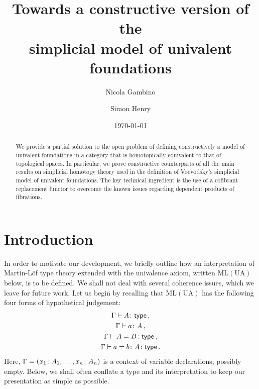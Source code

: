 \documentclass[reqno,10pt,a4paper,oneside,draft]{amsart}
\title[]{Towards a constructive version of the \\ simplicial model of univalent foundations}
\begin{document}
\begin{abstract}
We provide a partial solution to the open problem of defining constructively a model of univalent foundations in a category that is homotopically equivalent to that of topological spaces.
In particular, we prove constructive counterparts of all the main results on simplicial homotopy theory
used in the definition of Voevodsky's simplicial model of univalent foundations. The key technical ingredient
is the use of a cofibrant replacement functor to overcome the known issues regarding dependent products of fibrations.
\end{abstract}

\author{Nicola Gambino}

\author{Simon Henry}


 \date{\today}
 
 

\maketitle


\section{Introduction} 









In order to motivate our development, we briefly outline how an interpretation of Martin-L\"of type theory 
extended with the univalence axiom, written $\mathrm{ML(UA)}$ below, is to be defined. We shall not deal with several coherence issues, which we leave for future work. Let us begin by recalling that  $\mathrm{ML(UA)}$ has the following four forms of hypothetical judgement:
\begin{gather*}
 \Gamma \vdash A \colon \mathsf{type} \, ,  \\ 
 \Gamma \vdash a \colon A \, , \\
  \Gamma \vdash A  = B \colon \mathsf{type} \, ,  \\
 \Gamma \vdash a = b \colon A \colon \mathsf{type} \, .
  \end{gather*}
Here, $\Gamma  = (x_1 \colon A_1, \ldots, x_n \colon A_n)$ is a  context of variable declarations, possibly empty. Below, we shall often conflate a type and its interpretation to keep our presentation as simple as possible.
\end{document}
